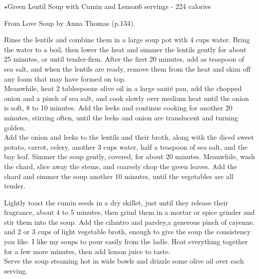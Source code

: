 \begin{recipe}{$\star$Green Lentil Soup with Cumin and Lemon}{6 servings - 224 calories}{}

\freeform From {\normalfont Love Soup} by Anna Thomas (p.134).


Rinse the lentils and combine them in a large soup pot with 4 cups water. Bring the water to a boil, then lower the heat and simmer the lentils gently for about 25 minutes, or until tender-firm. After the first 20 minutes, add as teaspoon of sea salt, and when the lentils are ready, remove them from the heat and skim off any foam that may have formed on top.\\

Meanwhile, heat 2 tablespoons olive oil in a large sauté pan, add the chopped onion and a pinch of sea salt, and cook slowly over medium heat until the onion is soft, 8 to 10 minutes. Add the leeks and continue cooking for another 20 minutes, stirring often, until the leeks and onion are translucent and turning golden.\\

Add the onion and leeks to the lentils and their broth, along with the diced sweet potato, carrot, celery, another 3 cups water, half a teaspoon of sea salt, and the bay leaf. Simmer the soup gently, covered, for about 20 minutes. Meanwhile, wash the chard, slice away the stems, and coarsely chop the green leaves. Add the chard and simmer the soup another 10 minutes, until the vegetables are all tender.\newpage

Lightly toast the cumin seeds in a dry skillet, just until they release their fragrance, about 4 to 5 minutes, then grind them in a mortar or spice grinder and stir them into the soup. Add the cilantro and parsley,a generous pinch of cayenne. and 2 or 3 cups of light vegetable broth, enough to give the soup the consistency you like. I like my soups to pour easily from the ladle. Heat everything together for a few more minutes, then add lemon juice to taste.\\

Serve the soup steaming hot in wide bowls and drizzle some olive oil over each serving.

\end{recipe}